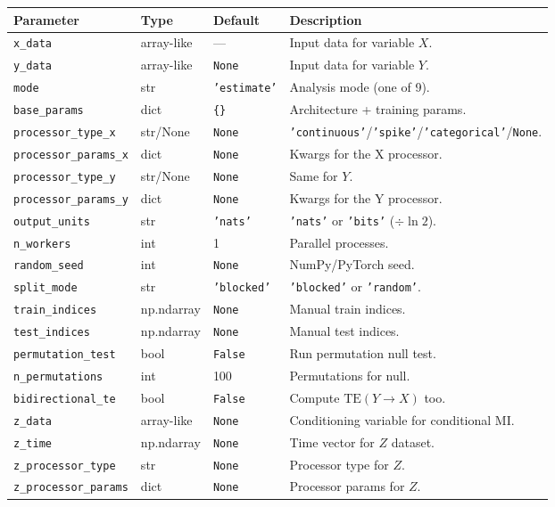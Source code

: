 \documentclass[12pt]{article}
\newcommand{\api}[1]{\texttt{#1}}
\begin{document}
\begin{center}
\small
\begin{tabular}{lllp{7cm}}
\toprule
\textbf{Parameter} & \textbf{Type} & \textbf{Default} & \textbf{Description} \\
\midrule
\api{x\_data} & array-like & — & Input data for variable $X$. \\
\api{y\_data} & array-like & \api{None} & Input data for variable $Y$. \\
\api{mode} & str & \api{'estimate'} & Analysis mode (one of 9). \\
\api{base\_params} & dict & \api{\{\}} & Architecture + training params. \\
\api{processor\_type\_x} & str/None & \api{None} & \api{'continuous'}/\api{'spike'}/\api{'categorical'}/\api{None}. \\
\api{processor\_params\_x} & dict & \api{None} & Kwargs for the X processor. \\
\api{processor\_type\_y} & str/None & \api{None} & Same for $Y$. \\
\api{processor\_params\_y} & dict & \api{None} & Kwargs for the Y processor. \\
\api{output\_units} & str & \api{'nats'} & \api{'nats'} or \api{'bits'} ($\div\ln 2$). \\
\api{n\_workers} & int & 1 & Parallel processes. \\
\api{random\_seed} & int & \api{None} & NumPy/PyTorch seed. \\
\api{split\_mode} & str & \api{'blocked'} & \api{'blocked'} or \api{'random'}. \\
\api{train\_indices} & np.ndarray & \api{None} & Manual train indices. \\
\api{test\_indices} & np.ndarray & \api{None} & Manual test indices. \\
\api{permutation\_test} & bool & \api{False} & Run permutation null test. \\
\api{n\_permutations} & int & 100 & Permutations for null. \\
\api{bidirectional\_te} & bool & \api{False} & Compute $\mathrm{TE}(Y\to X)$ too. \\
\api{z\_data} & array-like & \api{None} & Conditioning variable for conditional MI. \\
\api{z\_time} & np.ndarray & \api{None} & Time vector for $Z$ dataset. \\
\api{z\_processor\_type} & str & \api{None} & Processor type for $Z$. \\
\api{z\_processor\_params} & dict & \api{None} & Processor params for $Z$. \\
\bottomrule
\end{tabular}
\end{center}
\end{document}
